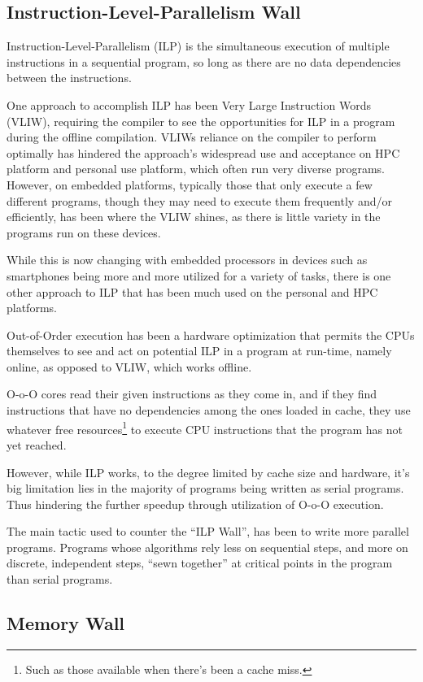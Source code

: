 \subsection{Instruction-Level-Parallelism Wall}

Instruction-Level-Parallelism (ILP) is the simultaneous execution of multiple instructions in a sequential program, so long as there are no data dependencies between the instructions.

One approach to accomplish ILP has been Very Large Instruction Words (VLIW), requiring the compiler to see the opportunities for ILP in a program during the offline compilation.
VLIWs reliance on the compiler to perform optimally has hindered the approach's widespread use and acceptance on HPC platform and personal use platform, which often run very diverse programs.
However, on embedded platforms, typically those that only execute a few different programs, though they may need to execute them frequently and/or efficiently, has been where the VLIW shines, as there is little variety in the programs run on these devices.

While this is now changing with embedded processors in devices such as smartphones being more and more utilized for a variety of tasks, there is one other approach to ILP that has been much used on the personal and HPC platforms.

Out-of-Order execution has been a hardware optimization that permits the CPUs themselves to see and act on potential ILP in a program at run-time, namely online, as opposed to VLIW, which works offline.

O-o-O cores read their given instructions as they come in, and if they find instructions that have no dependencies among the ones loaded in cache, they use whatever free resources\footnote{Such as those available when there's been a cache miss.} to execute CPU instructions that the program has not yet reached.

However, while ILP works, to the degree limited by cache size and hardware, it's big limitation lies in the majority of programs being written as serial programs.
Thus hindering the further speedup through utilization of O-o-O execution.

The main tactic used to counter the ``ILP Wall'', has been to write more parallel programs.
Programs whose algorithms rely less on sequential steps, and more on discrete, independent steps, ``sewn together'' at critical points in the program than serial programs.

\subsection{Memory Wall}

